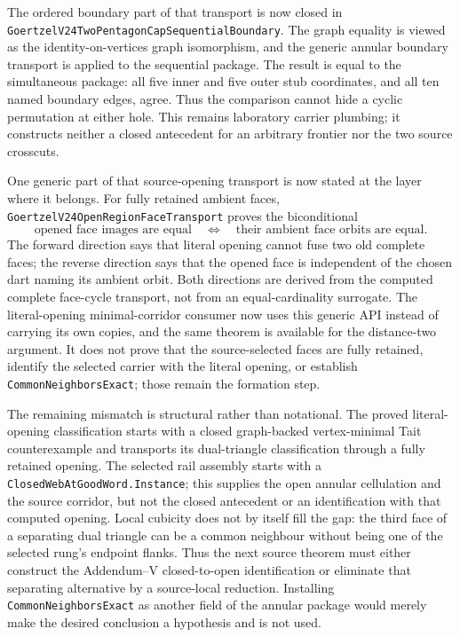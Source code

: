\documentclass[11pt]{article}
\theoremstyle{definition}
\begin{document}
The ordered boundary part of that transport is now closed in
\texttt{GoertzelV24TwoPentagonCapSequentialBoundary}.  The graph equality is
viewed as the identity-on-vertices graph isomorphism, and the generic annular
boundary transport is applied to the sequential package.  The result is
equal to the simultaneous package: all five inner and five outer stub
coordinates, and all ten named boundary edges, agree.  Thus the comparison
cannot hide a cyclic permutation at either hole.  This remains laboratory
carrier plumbing; it constructs neither a closed antecedent for an arbitrary
frontier nor the two source crosscuts.

One generic part of that source-opening transport is now stated at the layer
where it belongs.  For fully retained ambient faces,
\texttt{GoertzelV24OpenRegionFaceTransport} proves the biconditional
\[
  \text{opened face images are equal}
  \quad\Longleftrightarrow\quad
  \text{their ambient face orbits are equal}.
\]
The forward direction says that literal opening cannot fuse two old complete
faces; the reverse direction says that the opened face is independent of the
chosen dart naming its ambient orbit.  Both directions are derived from the
computed complete face-cycle transport, not from an equal-cardinality
surrogate.  The literal-opening minimal-corridor consumer now uses this
generic API instead of carrying its own copies, and the same theorem is
available for the distance-two argument.  It does not prove that the source-selected faces are
fully retained, identify the selected carrier with the literal opening, or
establish \texttt{CommonNeighborsExact}; those remain the formation step.

The remaining mismatch is structural rather than notational.  The proved
literal-opening classification starts with a closed graph-backed
vertex-minimal Tait counterexample and transports its dual-triangle
classification through a fully retained opening.  The selected rail assembly
starts with a \texttt{ClosedWebAtGoodWord.Instance}; this supplies the open
annular cellulation and the source corridor, but not the closed antecedent or
an identification with that computed opening.  Local cubicity does not by
itself fill the gap: the third face of a separating dual triangle can be a
common neighbour without being one of the selected rung's endpoint flanks.
Thus the next source theorem must either construct the Addendum--V
closed-to-open identification or eliminate that separating alternative by a
source-local reduction.  Installing \texttt{CommonNeighborsExact} as another
field of the annular package would merely make the desired conclusion a
hypothesis and is not used.
\end{document}
